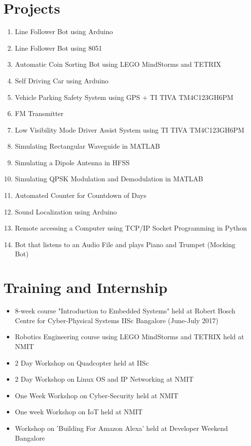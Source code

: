 \documentclass[12pt,a4paper,sans]{moderncv} %
\begin{document}

\section{Projects}

\begin{enumerate}
	\item Line Follower Bot using Arduino
	\item Line Follower Bot using 8051
	\item Automatic Coin Sorting Bot using LEGO MindStorms and TETRIX
	\item Self Driving Car using Arduino

	\item Vehicle Parking Safety System using GPS + TI TIVA TM4C123GH6PM
	\item FM Transmitter
	\item Low Visibility Mode Driver Assist System using
	TI TIVA TM4C123GH6PM 
	\item Simulating Rectangular Waveguide in MATLAB
	\item Simulating a Dipole Antenna in HFSS
	\item Simulating QPSK Modulation and Demodulation in MATLAB
	\item Automated Counter for Countdown of Days
	\item Sound Localization using Arduino
	
	\item Remote accessing a Computer using TCP/IP Socket Programming in Python
	\item Bot that listens to an Audio File and plays Piano and Trumpet (Mocking Bot) 
	\hfill 
	
\end{enumerate}
\hfill
 \break


\section{Training and Internship}

\begin{itemize}
	\item  8-week course "Introduction to Embedded Systems" held at Robert Bosch Centre for Cyber-Physical Systems IISc Bangalore (June-July 2017)
	\item Robotics Engineering course using LEGO MindStorms and TETRIX held at NMIT 
	\item 2 Day Workshop on Quadcopter held at IISc
	\item 2 Day Workshop on Linux OS and IP Networking at NMIT
	\item One Week Workshop on Cyber-Security held at NMIT
	\item One week Workshop on IoT held at NMIT
	\item Workshop on 'Building For Amazon Alexa' held at Developer Weekend Bangalore
\end{itemize}
\end{document}
